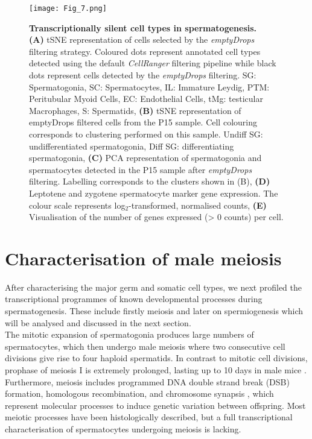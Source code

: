 \begin{figure}[!h]
\centering
\texttt{[image: Fig\_7.png]}
\caption[Transcriptionally silent cell types in spermatogenesis]{\textbf{Transcriptionally silent cell types in spermatogenesis.} \\
\textbf{(A)} tSNE representation of cells selected by the \emph{emptyDrops} filtering strategy. Coloured dots represent annotated cell types detected using the default \emph{CellRanger} filtering pipeline while black dots represent cells detected by the \emph{emptyDrops} filtering. SG: Spermatogonia, SC: Spermatocytes, IL: Immature Leydig, PTM: Peritubular Myoid Cells, EC: Endothelial Cells, tMg: testicular Macrophages, S: Spermatids, \textbf{(B)} tSNE representation of emptyDrops filtered cells from the P15 sample. Cell colouring corresponds to clustering performed on this sample. Undiff SG: undifferentiated spermatogonia, Diff SG: differentiating spermatogonia, \textbf{(C)} PCA representation of spermatogonia and spermatocytes detected in the P15 sample after \emph{emptyDrops} filtering. Labelling corresponds to the clusters shown in (B), \textbf{(D)} Leptotene and zygotene spermatocyte marker gene expression. The colour scale represents log$_2$-transformed, normalised counts, \textbf{(E)} Visualisation of the number of genes expressed (> 0 counts) per cell.}
\label{fig3:emptyDrops}
\end{figure}

\newpage

\section{Characterisation of male meiosis}

After characterising the major germ and somatic cell types, we next profiled the transcriptional programmes of known developmental processes during spermatogenesis. These include firstly meiosis and later on spermiogenesis which will be analysed and discussed in the next section.\\

The mitotic expansion of spermatogonia produces large numbers of spermatocytes, which then undergo male meiosis where two consecutive cell divisions give rise to four haploid spermatids. In contrast to mitotic cell divisions, prophase of meiosis I is extremely prolonged, lasting up to 10 days in male mice \citep{Soh2017}. Furthermore, meiosis includes programmed DNA double strand break (DSB) formation, homologous recombination, and chromosome synapsis \citep{Marston2004}, which represent molecular processes to induce genetic variation between offspring. Most meiotic processes have been histologically described, but a full transcriptional characterisation of spermatocytes undergoing meiosis is lacking. \\

